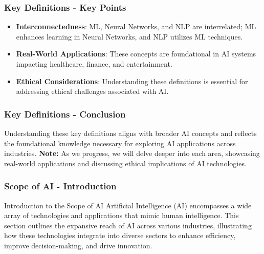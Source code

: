\documentclass[aspectratio=169]{beamer}
\begin{document}
\begin{frame}[fragile]
    \frametitle{Key Definitions - Key Points}
    \begin{itemize}
        \item \textbf{Interconnectedness}: ML, Neural Networks, and NLP are interrelated; ML enhances learning in Neural Networks, and NLP utilizes ML techniques.
        \item \textbf{Real-World Applications}: These concepts are foundational in AI systems impacting healthcare, finance, and entertainment.
        \item \textbf{Ethical Considerations}: Understanding these definitions is essential for addressing ethical challenges associated with AI.
    \end{itemize}
\end{frame}

\begin{frame}[fragile]
    \frametitle{Key Definitions - Conclusion}
    Understanding these key definitions aligns with broader AI concepts and reflects the foundational knowledge necessary for exploring AI applications across industries.
    \newline
    \textbf{Note:} As we progress, we will delve deeper into each area, showcasing real-world applications and discussing ethical implications of AI technologies.
\end{frame}

\begin{frame}[fragile]
    \frametitle{Scope of AI - Introduction}
    \begin{block}{Introduction to the Scope of AI}
        Artificial Intelligence (AI) encompasses a wide array of technologies and applications that mimic human intelligence. This section outlines the expansive reach of AI across various industries, illustrating how these technologies integrate into diverse sectors to enhance efficiency, improve decision-making, and drive innovation.
    \end{block}
\end{frame}
\end{document}
